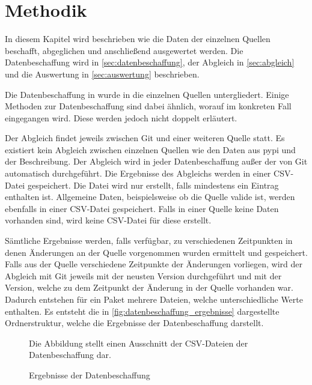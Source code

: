 \chapter{Methodik}
\label{chap:methodik}
In diesem Kapitel wird beschrieben wie die Daten der einzelnen Quellen beschafft, abgeglichen und anschließend ausgewertet werden.
Die Datenbeschaffung wird in \autoref{sec:datenbeschaffung}, der Abgleich in \autoref{sec:abgleich} und die Auswertung in \autoref{sec:auswertung} beschrieben.

Die Datenbeschaffung in wurde in die einzelnen Quellen untergliedert.
Einige Methoden zur Datenbeschaffung sind dabei ähnlich, worauf im konkreten Fall eingegangen wird.
Diese werden jedoch nicht doppelt erläutert.

Der Abgleich findet jeweils zwischen Git und einer weiteren Quelle statt.
Es existiert kein Abgleich zwischen einzelnen Quellen wie den Daten aus \gls{pypi} und der Beschreibung.
Der Abgleich wird in jeder Datenbeschaffung außer der von Git automatisch durchgeführt.
Die Ergebnisse des Abgleichs werden in einer CSV-Datei gespeichert.
Die Datei wird nur erstellt, falls mindestens ein Eintrag enthalten ist.
Allgemeine Daten, beispielsweise ob die Quelle valide ist, werden ebenfalls in einer CSV-Datei gespeichert.
Falls in einer Quelle keine Daten vorhanden sind, wird keine CSV-Datei für diese erstellt.

Sämtliche Ergebnisse werden, falls verfügbar, zu verschiedenen Zeitpunkten in denen Änderungen an der Quelle vorgenommen wurden ermittelt und gespeichert.
Falls aus der Quelle verschiedene Zeitpunkte der Änderungen vorliegen, wird der Abgleich mit Git jeweils mit der neusten Version durchgeführt und mit der Version, welche zu dem Zeitpunkt der Änderung in der Quelle vorhanden war.
Dadurch entstehen für ein Paket mehrere Dateien, welche unterschiedliche Werte enthalten.
Es entsteht die in \autoref{fig:datenbeschaffung_ergebnisse} dargestellte Ordnerstruktur, welche die Ergebnisse der Datenbeschaffung darstellt.

\begin{figure}
    \centering
    \caption{Ergebnisse der Datenbeschaffung}
    \label{fig:datenbeschaffung_ergebnisse}
    \small
    Die Abbildung stellt einen Ausschnitt der CSV-Dateien der Datenbeschaffung dar.
\end{figure}

